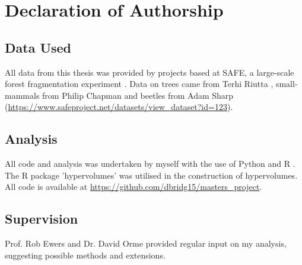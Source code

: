 \clearpage

\section*{Declaration of Authorship}

\subsection*{Data Used}

All data from this thesis was provided by projects based at SAFE, a large-scale forest fragmentation experiment \citep{Ewers2011}. Data on trees came from Terhi Riutta \citep{Riutta2018}, small-mammals from Philip Chapman \citep{Chapman2018} and beetles from Adam Sharp (\url{https://www.safeproject.net/datasets/view_dataset?id=123}).

\subsection*{Analysis}

All code and analysis was undertaken by myself with the use of Python and R \citep{RCoreTeam2017}. The R package 'hypervolumes' \citep{Blonder2017a} was utilised in the construction of hypervolumes. All code is available at \url{https://github.com/dbridg15/masters_project}.

\subsection*{Supervision}

Prof. Rob Ewers and Dr. David Orme provided regular input on my analysis, suggesting possible methods and extensions.
